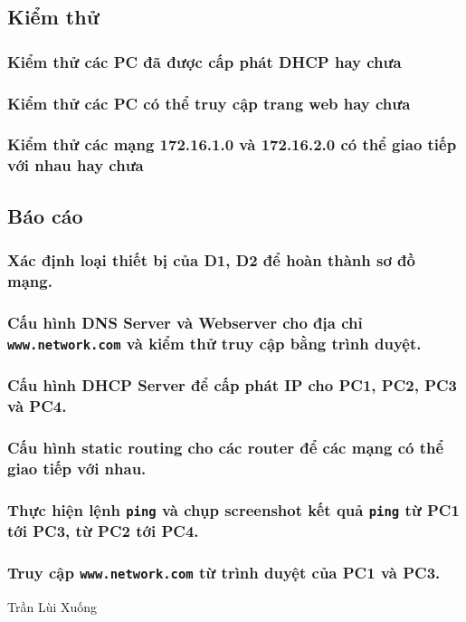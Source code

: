 \documentclass[]{article}
\begin{document}
\subsection{Kiểm thử}
\subsubsection{Kiểm thử các PC đã được cấp phát DHCP hay chưa}
\subsubsection{Kiểm thử các PC có thể truy cập trang web hay chưa}
\subsubsection{Kiểm thử các mạng 172.16.1.0 và 172.16.2.0 có thể giao tiếp với nhau hay chưa}
\subsection{Báo cáo}
\subsubsection{Xác định loại thiết bị của D1, D2 để hoàn thành sơ đồ mạng.}
\subsubsection{Cấu hình DNS Server và Webserver cho địa chỉ \texttt{www.network.com} và kiểm thử truy cập bằng trình duyệt.}
\subsubsection{Cấu hình DHCP Server để cấp phát IP cho PC1, PC2, PC3 và PC4.}
\subsubsection{Cấu hình static routing cho các router để các mạng có thể giao tiếp với nhau.}
\subsubsection{Thực hiện lệnh \texttt{ping} và chụp screenshot kết quả \texttt{ping} từ PC1 tới PC3, từ PC2 tới PC4.}
\subsubsection{Truy cập \texttt{www.network.com} từ trình duyệt của PC1 và PC3.}

\begin{thebibliography}{10}
Trần Lùi Xuống
\end{thebibliography}
\end{document}
